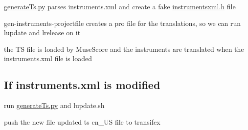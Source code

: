 
\begin{DoxyItemize}
\item {\ttfamily \hyperlink{generate_ts_8py_source}{generate\+Ts.\+py}} parses {\ttfamily instruments.\+xml} and create a fake {\ttfamily \hyperlink{instrumentsxml_8h_source}{instrumentsxml.\+h}} file
\item gen-\/instruments-\/projectfile creates a pro file for the translations, so we can run lupdate and lrelease on it
\item the TS file is loaded by Muse\+Score and the instruments are translated when the instruments.\+xml file is loaded
\end{DoxyItemize}

\subsection*{If instruments.\+xml is modified }


\begin{DoxyItemize}
\item run {\ttfamily \hyperlink{generate_ts_8py_source}{generate\+Ts.\+py}} and lupdate.\+sh
\item push the new file updated ts en\+\_\+\+US file to transifex 
\end{DoxyItemize}